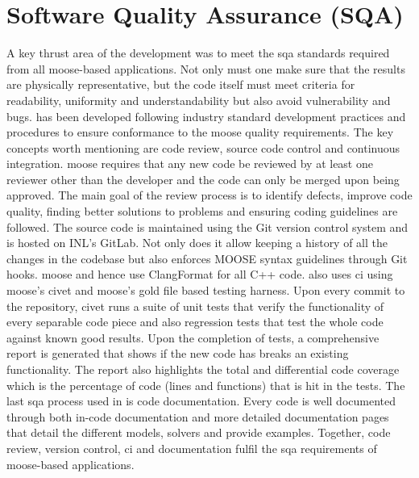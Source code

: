 \section{Software Quality Assurance (SQA)}
	A key thrust area of the {\GEM} development was to meet the \gls{sqa} standards required from all \gls{moose}-based applications. Not only must one make sure that the results are physically representative, but the code itself must meet criteria for readability, uniformity and understandability but also avoid vulnerability and bugs.
{\GEM} has been developed following industry standard  development practices and procedures to ensure conformance to the \gls{moose} quality requirements. The key concepts worth mentioning are code review, source code control and continuous integration. \gls{moose} requires that any new code be reviewed by at least one reviewer other than the developer and the code can only be merged upon being approved. The main goal of the review process is to identify defects, improve code quality, finding better solutions to problems and ensuring coding guidelines are followed. The source code is maintained using the Git version control system and is hosted on INL's GitLab. Not only does it allow keeping a history of all the changes in the codebase but also enforces MOOSE syntax guidelines through Git hooks. \gls{moose} and hence {\GEM} use ClangFormat for all C++ code. {\GEM} also uses \gls{ci} using \gls{moose}'s \gls{civet} \cite{Slaughter:2021aa} and \gls{moose}'s gold file based testing harness. Upon every commit to the repository, \gls{civet} runs a suite of unit tests that verify the functionality of every separable code piece and also regression tests that test the whole code against known good results. Upon the completion of tests, a comprehensive report is generated that shows if the new code has breaks an existing functionality. The report also highlights the total and differential code coverage which is the percentage of code (lines and functions) that is hit in the tests. The last \gls{sqa} process used in {\GEM} is code documentation. Every code is well documented through both in-code documentation and more detailed documentation pages that detail the different models, solvers and provide examples. Together, code review, version control, \gls{ci} and documentation fulfil the \gls{sqa} requirements of \gls{moose}-based applications.

